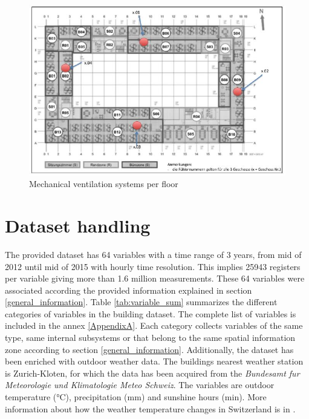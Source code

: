 \begin{figure}[h!]
  \vspace{0.5em} %
  \includegraphics[scale=0.6]{Figures/temperature.jpg}
  \caption{Mechanical ventilation systems per floor \cite{roman2015}}  
  \label{fig:temperature}
\end{figure}


\section{Dataset handling}

The provided dataset has 64 variables with a time range of 3 years, from mid of 2012 until mid of 2015 with hourly time resolution. This implies 25943 registers per variable giving more than 1.6 million measurements. These 64 variables were associated according the provided information explained in section \ref{general_information}.  Table \ref{tab:variable_sum} summarizes the different categories of variables in the building dataset. The complete list of variables is included in the annex \ref{AppendixA}. Each category collects variables of the same type, same internal subsystems or that belong to the same spatial information zone according to section \ref{general_information}. Additionally, the dataset has been enriched with outdoor weather data. The buildings nearest weather station is Zurich-Kloten, for which the data has been acquired from the \textit{Bundesamt fur Meteorologie und Klimatologie Meteo Schweiz}. The variables are outdoor temperature (°C), precipitation (mm) and sunshine hours (min). More information about how the weather temperature changes in Switzerland is in  \cite{rebetez2008monthly}.
   
